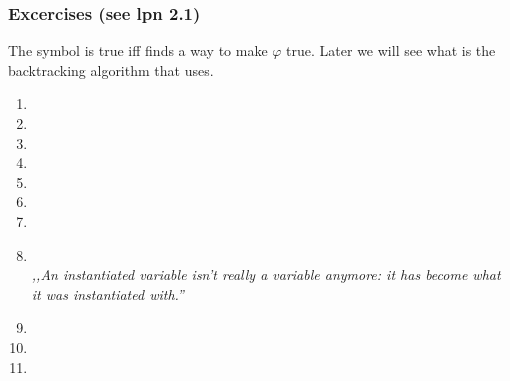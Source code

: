 \begin{frame}[t]
\frametitle{Excercises (see lpn 2.1)}
The symbol \ml{$\varphi$} is true iff \prolog finds a way to make $\varphi$ true. Later we will see what is the backtracking algorithm that \prolog uses.
\begin{enumerate}
\item {} \valasz {}
\item {} \valasz {}
\item {} \valasz {}
\item {} \valasz {}
\item {} \valasz {}
\item {} \valasz {}
\item {} \valasz {}
\item {} \valasz {}
\\ \hfill \emph{,,An instantiated variable isn’t really a variable anymore: it has become what it was instantiated with.''}
\item {} \valasz {}
\item {} \valasz {}
\item {} \valasz {}
\end{enumerate}
\end{frame}
